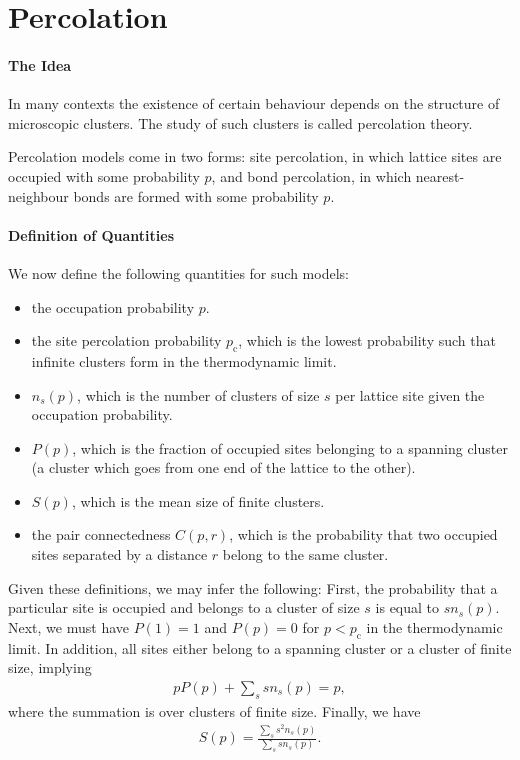 \section{Percolation}

\paragraph{The Idea}
In many contexts the existence of certain behaviour depends on the structure of microscopic clusters. The study of such clusters is called percolation theory.

Percolation models come in two forms: site percolation, in which lattice sites are occupied with some probability $p$, and bond percolation, in which nearest-neighbour bonds are formed with some probability $p$.

\paragraph{Definition of Quantities}
We now define the following quantities for such models:

\begin{itemize}
	\item the occupation probability $p$.
	\item the site percolation probability $p_{\text{c}}$, which is the lowest probability such that infinite clusters form in the thermodynamic limit.
	\item $n_{s}(p)$, which is the number of clusters of size $s$ per lattice site given the occupation probability.
	\item $P(p)$, which is the fraction of occupied sites belonging to a spanning cluster (a cluster which goes from one end of the lattice to the other).
	\item $S(p)$, which is the mean size of finite clusters.
	\item the pair connectedness $C(p, r)$, which is the probability that two occupied sites separated by a distance $r$ belong to the same cluster.
\end{itemize}

Given these definitions, we may infer the following: First, the probability that a particular site is occupied and belongs to a cluster of size $s$ is equal to $sn_{s}(p)$. Next, we must have $P(1) = 1$ and $P(p) = 0$ for $p < p_{\text{c}}$ in the thermodynamic limit. In addition, all sites either belong to a spanning cluster or a cluster of finite size, implying
\begin{align*}
	pP(p) + \sum\limits_{s}sn_{s}(p) = p,
\end{align*}
where the summation is over clusters of finite size. Finally, we have
\begin{align*}
	S(p) = \frac{\sum\limits_{s}s^{2}n_{s}(p)}{\sum\limits_{s}sn_{s}(p)}.
\end{align*}

